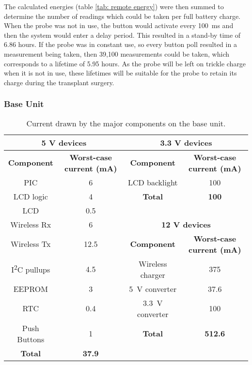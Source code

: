 The calculated energies (table \ref{tab: remote energy}) were then summed to determine the number of readings which could be taken per full battery charge. When the probe was not in use, the button would activate every \SI{100}{\milli\second} and then the system would enter a delay period. This resulted in a stand-by time of 6.86 hours. If the probe was in constant use, so every button poll resulted in a measurement being taken, then 39,100 measurements could be taken, which corresponds to a lifetime of 5.95 hours. As the probe will be left on trickle charge when it is not in use, these lifetimes will be suitable for the probe to retain its charge during the transplant surgery.



\subsubsection{Base Unit}

\begin{table}[ht]
	\centering
	\caption{Current drawn by the major components on the base unit.}
	\label{tab: base current}
	\begin{adjustwidth}{-.5in}{-.5in}
	\begin{center}
	\begin{tabular}{|c|c|c|c|}
	\hline
	\multicolumn{2}{|c}{\textbf{5 V devices}} & \multicolumn{2}{|c|}{\textbf{3.3 V devices}}\\
	\hline
	\textbf{Component} & \textbf{Worst-case current (mA)} & \textbf{Component} & \textbf{Worst-case current (mA)} \\
	\hline
	PIC & 6 & LCD backlight & 100 \\
	\cline{3-4}
	LCD logic & 4 & \textbf{Total} & \textbf{100}\\
	\cline{3-4}
	LCD & 0.5 & \multicolumn{2}{c}{} \\
	\cline{3-4}
	Wireless Rx & 6 &  \multicolumn{2}{c|}{\textbf{12 V devices}} \\
	\cline{3-4}
	Wireless Tx & 12.5 & \textbf{Component} & \textbf{Worst-case current (mA)}  \\
	\cline{3-4}
	I\textsuperscript{2}C pullups & 4.5 & Wireless charger & 375 \\
	EEPROM & 3 & \SI{5}{\volt} converter & 37.6 \\
	RTC & 0.4 & \SI{3.3}{\volt} converter & 100 \\
	\cline{3-4}
	Push Buttons & 1 & \textbf{Total} & \textbf{512.6}  \\
	\hline
	\textbf{Total} & \textbf{37.9}  \\
	\cline{1-2}
	\end{tabular}
	\end{center}
	\end{adjustwidth}
\end{table}


